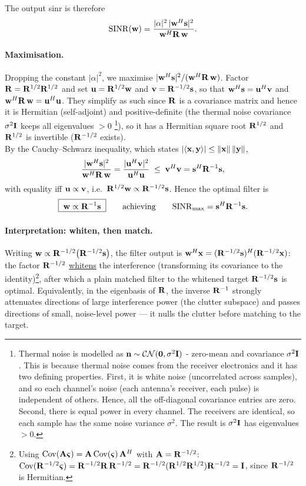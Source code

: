 \documentclass{article}
\begin{document}
The output \gls{sinr} is therefore
\[
  \mathrm{SINR}(\vb w) = \frac{|\alpha|^2\,|\vb w^H\vb s|^2}{\vb w^H\vb R\,\vb w}.
\]

\paragraph{Maximisation.}
Dropping the constant $|\alpha|^2$, we maximise $|\vb w^H\vb s|^2/(\vb w^H\vb R\,\vb w)$.
Factor $\vb R = \vb R^{1/2}\vb R^{1/2}$ and set $\vb u = \vb R^{1/2}\vb w$ and
$\vb v = \vb R^{-1/2}\vb s$, so that $\vb w^H\vb s = \vb u^H\vb v$ and
$\vb w^H\vb R\,\vb w = \vb u^H\vb u$. They simplify as such since $\mathbf{R}$ is a covariance matrix and hence it is Hermitian (self-adjoint) and positive-definite (the thermal noise covariance $\sigma^2\mathbf{I}$ keeps all eigenvalues $> 0$ \footnote{Thermal noise is modelled as $\vb n\sim\mathcal{CN}(\vb 0, \sigma^2\mathbf{I})$ - zero-mean and covariance $\sigma^2\mathbf{I}$. This is because thermal noise comes from the receiver electronics and it has two defining properties. First, it is white noise (uncorrelated across samples), and so each channel's noise (each antenna's receiver, each pulse) is independent of others. Hence, all the off-diagonal covariance entries are zero. Second, there is equal power in every channel. The receivers are identical, so each sample has the same noise variance $\sigma^2$. The result is $\sigma^2 \mathbf{I}$ has eigenvalues $>0$.}), so it has a Hermitian square root $\mathbf{R}^{1/2}$ and $\mathbf{R}^{1/2}$ is invertible ($\mathbf{R}^{-1/2}$ exists). \\

By the Cauchy--Schwarz inequality, which states $|\langle \vb x, \vb y\rangle| \leq \lVert \vb x\rVert\,\lVert \vb y\rVert$,
\[
  \frac{|\vb w^H\vb s|^2}{\vb w^H\vb R\,\vb w}
  = \frac{|\vb u^H\vb v|^2}{\vb u^H\vb u}
  \;\le\; \vb v^H\vb v = \vb s^H\vb R^{-1}\vb s,
\]
with equality iff $\vb u \propto \vb v$, i.e.\ $\vb R^{1/2}\vb w \propto \vb R^{-1/2}\vb s$.
Hence the optimal filter is
\[
  \boxed{\;\vb w \propto \vb R^{-1}\vb s\;}
  \qquad\text{achieving}\qquad
  \mathrm{SINR}_{\max} = \vb s^H\vb R^{-1}\vb s.
\]

\paragraph{Interpretation: whiten, then match.}
Writing $\vb w \propto \vb R^{-1/2}\big(\vb R^{-1/2}\vb s\big)$, the filter output is $\vb w^H\vb x = (\vb R^{-1/2}\vb s)^H(\vb R^{-1/2}\vb x)$: the factor $\vb R^{-1/2}$ \underline{whitens} the interference (transforming its covariance to the identity)\footnote{Using $\mathrm{Cov}(\mathbf{A}\boldsymbol{\varsigma})=\mathbf{A}\,\mathrm{Cov}(\boldsymbol{\varsigma})\,\mathbf{A}^H$ with $\mathbf{A}=\mathbf{R}^{-1/2}$:
$\mathrm{Cov}(\mathbf{R}^{-1/2}\boldsymbol{\varsigma})=\mathbf{R}^{-1/2}\mathbf{R}\,\mathbf{R}^{-1/2}
=\mathbf{R}^{-1/2}(\mathbf{R}^{1/2}\mathbf{R}^{1/2})\mathbf{R}^{-1/2}=\mathbf{I}$, since $\mathbf{R}^{-1/2}$ is Hermitian.}, after which a plain matched filter to the whitened target $\vb R^{-1/2}\vb s$ is optimal. Equivalently, in the eigenbasis of $\vb R$, the inverse $\vb R^{-1}$ strongly attenuates directions of large interference power (the clutter subspace) and passes directions of small, noise-level power --- it nulls the clutter before matching to the target.
\end{document}
